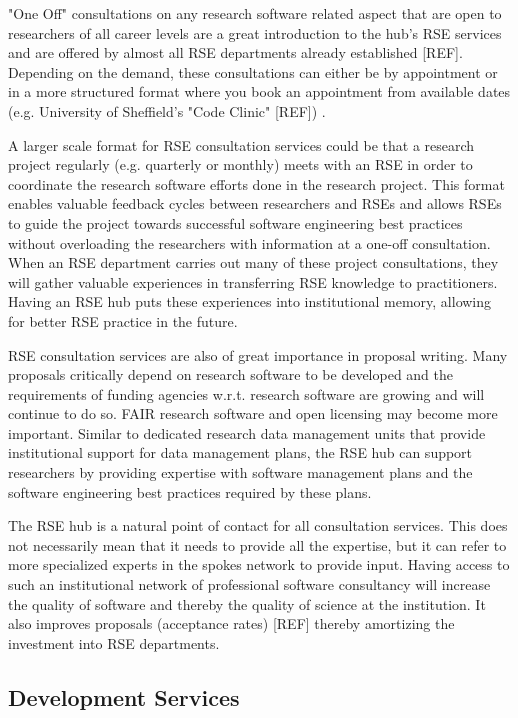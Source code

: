 \documentclass{article}
\begin{document}
"One Off" consultations on any research software related aspect that are open to researchers of all career levels are
a great introduction to the hub's RSE services and are offered by almost all RSE departments already established [REF].
Depending on the demand, these consultations can either be by appointment or in a more structured format where you book an appointment from available dates (e.g. University of Sheffield's "Code Clinic" [REF]) .

A larger scale format for RSE consultation services could be that a research project regularly (e.g. quarterly or monthly) meets with an RSE in order to coordinate the research software efforts done in the research project.
This format enables valuable feedback cycles between researchers and RSEs and allows RSEs to guide the project
towards successful software engineering best practices without overloading the researchers with information at a one-off consultation.
When an RSE department carries out many of these project consultations, they will gather valuable experiences in transferring RSE knowledge to practitioners.
Having an RSE hub puts these experiences into institutional memory, allowing for better RSE practice in the future.

RSE consultation services are also of great importance in proposal writing.
Many proposals critically depend on research software to be developed and the requirements of funding agencies w.r.t. research software are growing and will continue to do so.
FAIR research software and open licensing may become more important.
Similar to dedicated research data management units that provide institutional support for data management plans,
the RSE hub can support researchers by providing expertise with software management plans and the software engineering best practices required by these plans.

The RSE hub is a natural point of contact for all consultation services.
This does not necessarily mean that it needs to provide all the expertise, but it can refer to more specialized experts in the spokes network to provide input.
Having access to such an institutional network of professional software consultancy will increase the quality of software and thereby the quality of science at the institution.
It also improves proposals (acceptance rates) [REF] thereby amortizing the investment into RSE departments.

\subsection{Development Services}
\end{document}

